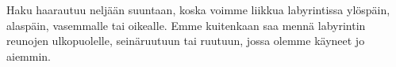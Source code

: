 Haku haarautuu neljään suuntaan, koska voimme liikkua labyrintissa
ylöspäin, alaspäin, vasemmalle tai oikealle.
Emme kuitenkaan saa mennä labyrintin reunojen ulkopuolelle,
seinäruutuun tai ruutuun, jossa olemme käyneet jo aiemmin.


% 
% 
% 
% 
% 
% 
% 
% 
